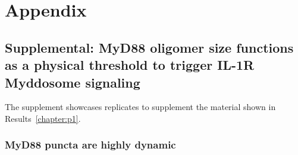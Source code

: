 \mygeometry
\part{Appendix}
\restoregeometry
\appendix
\renewcommand{\thechapter}{\alph{chapter}}
\chapter{Supplemental: MyD88 oligomer size functions as a physical threshold to trigger IL-1R Myddosome signaling}
\justify
The supplement showcases replicates to supplement the material shown in Results~\ref{chapter:p1}.

\section{MyD88 puncta are highly dynamic}
